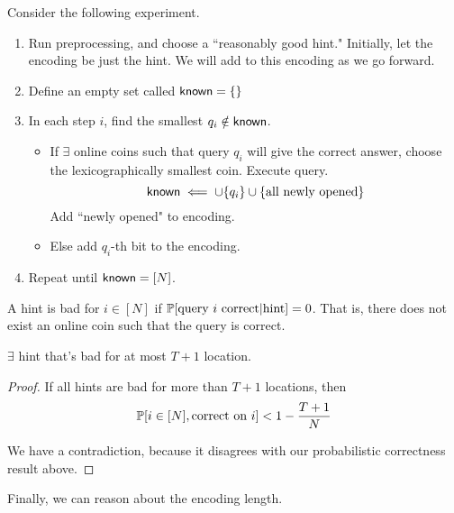 Consider the following experiment.
\begin{enumerate}
    \item Run preprocessing, and choose a ``reasonably good hint." Initially, let the encoding be just the hint. We will add to this encoding as we go forward.
    \item Define an empty set called ${\sf known} = \{\}$
    \item In each step $i$, find the smallest $q_i \notin {\sf known}$. 
    \begin{itemize}
        \item If $\exists$ online coins such that query $q_i$ will give the correct answer, choose the lexicographically smallest coin. Execute query.
        \[{\sf known} \impliedby \cup \{q_i\} \cup \{\text{all newly opened}\}\]
        Add ``newly opened" to encoding.
        \item Else add $q_i$-th bit to the encoding.
    \end{itemize}
    \item Repeat until ${\sf known} = [N]$.
    
\end{enumerate}

A hint is bad for $i \in [N]$ if $\mathbb{P}[\text{query $i$ correct} | \text{hint}] = 0$. That is, there does not exist an online coin such that the query is correct.

\begin{claim}
    $\exists$ hint that's bad for at most $T + 1$ location.
\end{claim}
\begin{proof}
    If all hints are bad for  more than $T+1$ locations, then
    \[\mathbb{P}[i \in [N], \text{correct on $i$}] < 1 - \frac{T+1}{N}\]

    We have a contradiction, because it disagrees with our probabilistic correctness result above.
\end{proof}

Finally, we can reason about the encoding length. 


